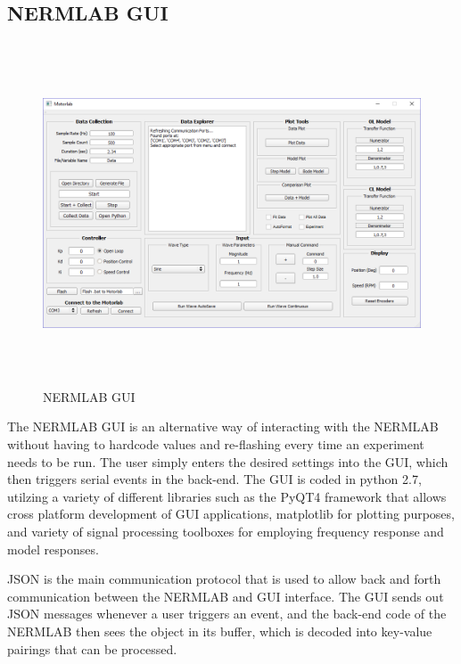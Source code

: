 \subsection{NERMLAB GUI}

\begin{figure}[H] 
	\begin{center}
		\includegraphics[height=4in]{figures/NERMLABGUI.png}
		
		\caption[NERMLAB GUI]{NERMLAB GUI}
		
		\label{NERMLAB_GUI}
	\end{center}
\end{figure}

The NERMLAB GUI is an alternative way of interacting with the NERMLAB without having to hardcode values and re-flashing every time an experiment needs to be run. The user simply enters the desired settings into the GUI, which then triggers serial events in the back-end. The GUI is coded in python 2.7, utilzing a variety of different libraries such as the PyQT4 framework that allows cross platform development of GUI applications, matplotlib for plotting purposes, and variety of signal processing toolboxes for employing frequency response and model responses. 

\ac{JSON} is the main communication protocol that is used to allow back and forth communication between the NERMLAB and GUI interface. The GUI sends out JSON messages whenever a user triggers an event, and the back-end code of the NERMLAB then sees the object in its buffer, which is decoded into key-value pairings that can be processed.

